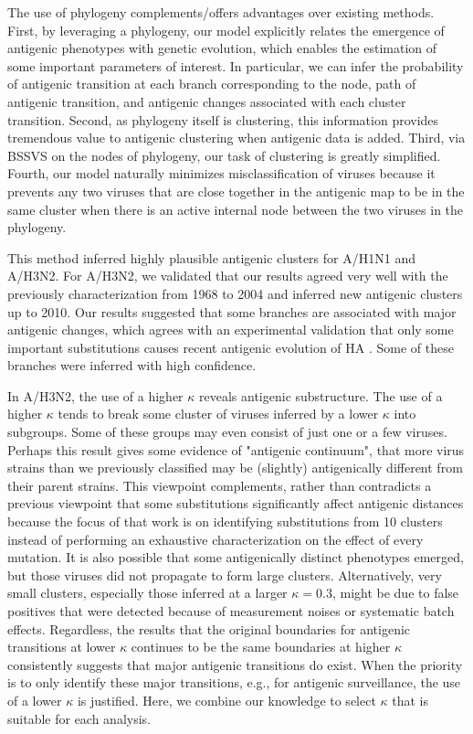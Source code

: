 \documentclass[11pt,oneside,letterpaper]{article}
\begin{document}
The use of phylogeny complements/offers advantages over existing methods. 
First, by leveraging a phylogeny, our model explicitly relates the emergence of antigenic phenotypes with genetic evolution, which enables the estimation of some important parameters of interest. 
In particular, we can infer the probability of antigenic transition at each branch corresponding to the node, path of antigenic transition, and antigenic changes associated with each cluster transition. 
Second, as phylogeny itself is clustering, this information provides tremendous value to antigenic clustering when antigenic data is added. 
Third, via BSSVS on the nodes of phylogeny, our task of clustering is greatly simplified. 
Fourth, our model naturally minimizes misclassification of viruses because it prevents any two viruses that are close together in the antigenic map to be in the same cluster when there is an active internal node between the two viruses in the phylogeny.

This method inferred highly plausible antigenic clusters for A/H1N1 and A/H3N2. 
For  A/H3N2, we validated that our results agreed very well with the previously characterization from 1968 to 2004 \cite{smith_mapping_2004} and inferred new antigenic clusters up to 2010. 
Our results suggested that some branches are associated with major antigenic changes, which agrees with an experimental validation that only some important substitutions causes recent antigenic evolution of HA \cite{koel_substitutions_2013}. 
Some of these branches were inferred with high confidence. 


In A/H3N2, the use of a higher $\kappa$ reveals antigenic substructure. 
The use of a higher $\kappa$ tends to break some cluster of viruses inferred by a lower $\kappa$ into subgroups. 
Some of these groups may even consist of just one or a few viruses. 
Perhaps this result gives some evidence of "antigenic continuum", that more virus strains than we previously classified may be (slightly) antigenically different from their parent strains. 
This viewpoint complements, rather than contradicts a previous viewpoint that some substitutions significantly affect antigenic distances \cite{koel_substitutions_2013} because the focus of that work is on identifying substitutions from 10 clusters instead of performing an exhaustive characterization on the effect of every mutation. 
It is also possible that some antigenically distinct phenotypes emerged, but those viruses did not propagate to form large clusters.
Alternatively, very small clusters, especially those inferred at a larger $\kappa=0.3$, might be due to false positives that were detected because of measurement noises or systematic batch effects.
Regardless, the results that the original boundaries for antigenic transitions at lower $\kappa$ continues to be the same boundaries at higher $\kappa$ consistently suggests that major antigenic transitions do exist. 
When the priority is to only identify these major transitions, e.g., for antigenic surveillance, the use of a lower $\kappa$ is justified.  
Here, we combine our knowledge to select $\kappa$ that is suitable for each analysis.
\end{document}
